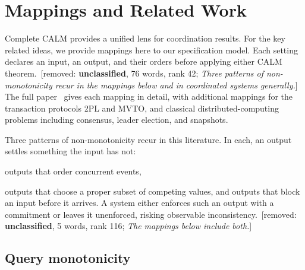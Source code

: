 \documentclass[sigconf]{cidr-2027}
\theoremstyle{remark}
\newcommand{\commitment}{commitment\xspace}
\newcommand{\removednote}[1]{{\color{cutred}\footnotesize\,[removed: #1]\,}}
\begin{document}
\section{Mappings and Related Work}
\label{sec:instances}
\label{sec:related}

\textcolor{newblue}{Complete CALM provides a unified lens for coordination results.} For
the key related ideas, we provide mappings here to our specification model. Each
setting declares an input, an output, and their orders before applying either
CALM theorem. \removednote{\textbf{unclassified}, 76 words, rank 42; \textit{Three patterns of non-monotonicity recur in the mappings below and in coordinated systems generally.}} \textcolor{newblue}{The full paper~\cite{hellerstein2026completecalmfull} gives each
mapping in detail, with additional mappings for the transaction protocols 2PL
and MVTO, and classical distributed-computing problems
including consensus, leader election, and snapshots.}

\textcolor{newblue}{Three patterns of non-monotonicity recur in this literature.} In each, an output settles something the input
has not:


outputs that order concurrent events,

\textcolor{newblue}{outputs that choose a proper subset of competing values, and
outputs that block an input before it arrives.} A system either enforces such
an output with a \commitment or leaves it unenforced, risking observable
inconsistency. \removednote{\textbf{unclassified}, 5 words, rank 116; \textit{The mappings below include both.}}






\subsection{Query monotonicity}
\label{sec:query-instance}
\end{document}
